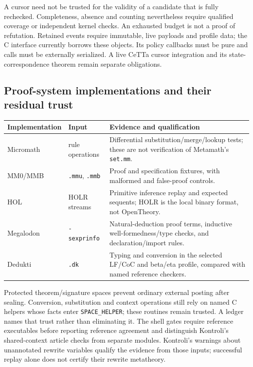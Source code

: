\documentclass[11pt,a4paper]{article}
\theoremstyle{definition}
\begin{document}
A cursor need not be trusted for the validity of a candidate that is fully
rechecked. Completeness, absence and counting nevertheless require qualified
coverage or independent kernel checks. An exhausted budget is not a proof of
refutation. Retained events require immutable, live payloads and profile data;
the C interface currently borrows these objects. Its policy callbacks must be
pure and calls must be externally serialized. A live CeTTa cursor integration
and its state-correspondence theorem remain separate obligations.

\subsection{Proof-system implementations and their residual trust}
\begin{center}
\begin{tabular}{@{}llp{8cm}@{}}
\toprule
Implementation & Input & Evidence and qualification \\
\midrule
Micromath & rule operations & Differential substitution/merge/lookup tests;
these are not verification of Metamath's \texttt{set.mm}. \\
MM0/MMB & \texttt{.mmu}, \texttt{.mmb} & Proof and specification fixtures,
with malformed and false-proof controls. \\
HOL & HOLR streams & Primitive inference replay and expected sequents;
HOLR is the local binary format, not OpenTheory. \\
Megalodon & \texttt{-sexprinfo} & Natural-deduction proof terms, inductive
well-formedness/type checks, and declaration/import rules. \\
Dedukti & \texttt{.dk} & Typing and conversion in the selected LF/CoC and
beta/eta profile, compared with named reference checkers. \\
\bottomrule
\end{tabular}
\end{center}

Protected theorem/signature spaces prevent ordinary external posting after
sealing. Conversion, substitution and context operations still rely on named C
helpers whose facts enter \texttt{SPACE\_HELPER}; these routines remain trusted.
A ledger names that trust rather than eliminating it. The shell gates require
reference executables before reporting reference agreement and distinguish
Kontroli's shared-context article checks from separate modules. Kontroli's
warnings about unannotated rewrite variables qualify the evidence from those
inputs; successful replay alone does not certify their rewrite metatheory.
\end{document}
